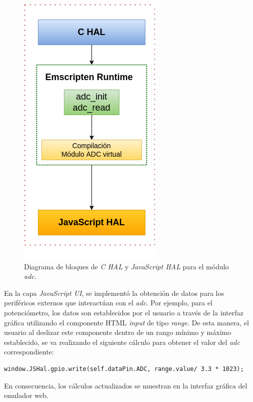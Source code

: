 \begin{figure}[ht]
	\centering
	\includegraphics[scale=.53]{./Figures/adcEmscripten.png}
	\caption{Diagrama de bloques de \textit{C HAL} y \textit{JavaScript HAL} para el módulo \textit{adc}.}
	\label{fig:adcEmscripten}
\end{figure}

\hfill \break
\hfill \break
\hfill \break
\hfill \break

En la capa \textit{JavaScript UI}, se implementó la obtención de datos para los periféricos externos que interactúan con el \textit{adc}. Por ejemplo, para el potenciómetro, los datos son establecidos por el usuario a través de la interfaz gráfica utilizando el componente HTML  \textit{input} de tipo \textit{range}. De esta manera, el usuario al deslizar este componente dentro de un rango mínimo y máximo establecido, se va realizando el siguiente cálculo para obtener el valor del \textit{adc} correspondiente:

\begin{lstlisting}[caption={Cálculo del ADC para el potenciómetro.}]
  window.JSHal.gpio.write(self.dataPin.ADC, range.value/ 3.3 * 1023);
\end{lstlisting}

En consecuencia, los cálculos actualizados se muestran en la interfaz gráfica del emulador web.

